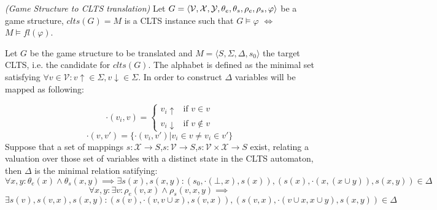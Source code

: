\begin{definition}
	\label{def:gs_to_clts_translation} \emph{(Game Structure to CLTS translation)} 
Let $G =  \langle {\mathcal{V}}, {\mathcal{X}}, {\mathcal{Y}}, {\theta_e}, {\theta_s}, {\rho_e}, {\rho_s}, \varphi \rangle$ be a game structure, $clts(G)=M$ is a CLTS instance such that $G \models \varphi$ $\iff$ $M \models fl(\varphi)$.
\end{definition}

Let $G$ be the game structure to be translated and $M=\langle S, \Sigma, \Delta, s_0 \rangle$ the target CLTS, i.e. the candidate for $clts(G)$.  The alphabet is defined as the minimal set satisfying 
$\forall v \in \mathcal{V}: v\uparrow \in \Sigma, v\downarrow \in \Sigma$. 
In order to construct $\Delta$ variables will be mapped as following:

\[
\cdot(v_i,v) = \begin{cases}
v_i\uparrow & \text{if } v \in v \\
v_i\downarrow & \text{if } v \not\in v
\end{cases}
\]
\[\cdot(v,v') = \lbrace \cdot (v_i,v') | v_i \in v \neq v_i \in v' \rbrace \]
Suppose that a set of mappings $s:\mathcal{X}\rightarrow S$,$s:\mathcal{V} \rightarrow S$,$s:\mathcal{V} \times \mathcal{X} \rightarrow S$ exist, relating a valuation over those set of variables with a distinct state in the CLTS automaton, then $\Delta$ is the minimal relation satifying:
	\[
	\forall x, y: \theta_e(x) \wedge \theta_s(x,y) \implies \exists s(x),s(x,y) : (s_0, \cdot (\bot, x), s(x)), (s(x), \cdot (x,(x \cup y)), s(x,y)) \in \Delta 
	\] 
	\[
	\forall x, y : \exists v: \rho_e(v,x) \wedge \rho_s(v,x,y) \implies\]
	\[\exists s(v),s(v,x),s(x,y) : (s(v), \cdot (v, v \cup x),s(v,x)), (s(v,x), \cdot (v \cup x,x \cup y), s(x,y)) \in \Delta 
	\] 


